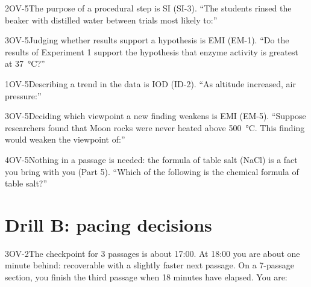 \documentclass[11pt]{article}
\begin{document}
\begin{q}{2}{OV-5}{The purpose of a procedural step is SI (SI-3).}
``The students rinsed the beaker with distilled water between trials most likely to:''
\end{q}

\begin{q}{3}{OV-5}{Judging whether results support a hypothesis is EMI (EM-1).}
``Do the results of Experiment 1 support the hypothesis that enzyme activity is greatest at \SI{37}{\celsius}?''
\end{q}

\begin{q}{1}{OV-5}{Describing a trend in the data is IOD (ID-2).}
``As altitude increased, air pressure:''
\end{q}

\begin{q}{3}{OV-5}{Deciding which viewpoint a new finding weakens is EMI (EM-5).}
``Suppose researchers found that Moon rocks were never heated above \SI{500}{\celsius}. This finding would weaken the viewpoint of:''
\end{q}

\begin{q}{4}{OV-5}{Nothing in a passage is needed: the formula of table salt (NaCl) is a fact you bring with you (Part 5).}
``Which of the following is the chemical formula of table salt?''
\end{q}

\section{Drill B: pacing decisions}

\begin{q}{3}{OV-2}{The checkpoint for 3 passages is about 17:00. At 18:00 you are about one minute behind: recoverable with a slightly faster next passage.}
On a 7-passage section, you finish the third passage when 18 minutes have elapsed. You are:
\end{q}
\end{document}

